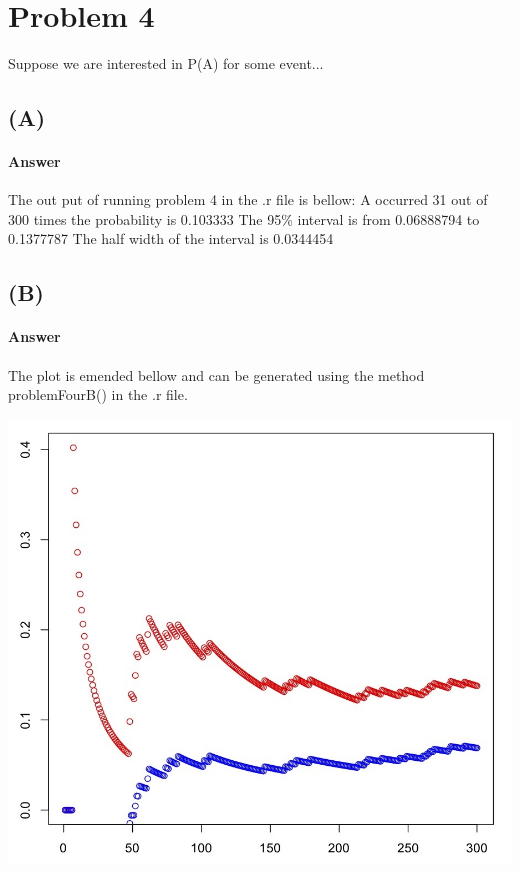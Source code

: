 \documentclass[12pt]{article}
\begin{document}
\section*{Problem 4}
Suppose we are interested in P(A) for some event...

\subsection*{(A)}

\paragraph{Answer}
The out put of running problem 4 in the .r file is bellow:\newline
A occurred 31 out of  300 times\newline
the probability is  0.103333 \newline
The 95\% interval is from 0.06888794 to 0.1377787\newline
The half width of the interval is  0.0344454  \newline

\subsection*{(B)}

\paragraph{Answer}
The plot is emended bellow and can be generated using the method problemFourB() in the .r file.
\begin{center}
	\includegraphics[width=\linewidth]{HW1 prob4 chart.jpg}
\end{center}
\end{document}
